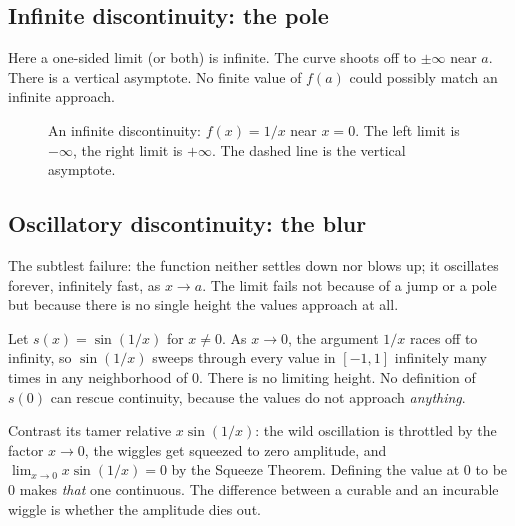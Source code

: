\subsection{Infinite discontinuity: the pole}

Here a one-sided limit (or both) is infinite. The curve shoots off to $\pm\infty$ near
$a$. There is a vertical asymptote. No finite value of $f(a)$ could possibly match an
infinite approach.

\begin{figure}[H]
\centering
{}
\caption{An infinite discontinuity: $f(x)=1/x$ near $x=0$. The left limit is $-\infty$,
the right limit is $+\infty$. The dashed line is the vertical asymptote.}
\label{ch08:fig-infinite}
\end{figure}

\subsection{Oscillatory discontinuity: the blur}

The subtlest failure: the function neither settles down nor blows up; it oscillates
forever, infinitely fast, as $x\to a$. The limit fails not because of a jump or a pole but
because there is no single height the values approach at all.

\begin{example}
\label{ch08:ex-osc}
Let $s(x)=\sin(1/x)$ for $x\ne 0$. As $x\to 0$, the argument $1/x$ races off to infinity,
so $\sin(1/x)$ sweeps through every value in $[-1,1]$ infinitely many times in any
neighborhood of $0$. There is no limiting height. No definition of $s(0)$ can rescue
continuity, because the values do not approach \emph{anything}.

Contrast its tamer relative $x\sin(1/x)$: the wild oscillation is throttled by the factor
$x\to 0$, the wiggles get squeezed to zero amplitude, and $\lim_{x\to 0}x\sin(1/x)=0$ by
the Squeeze Theorem. Defining the value at $0$ to be $0$ makes \emph{that} one continuous.
The difference between a curable and an incurable wiggle is whether the amplitude dies
out.
\end{example}


